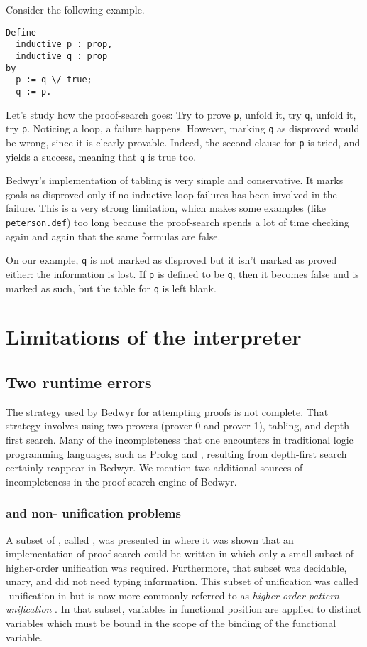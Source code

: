 Consider the following example.
\begin{verbatim}
Define
  inductive p : prop,
  inductive q : prop
by
  p := q \/ true;
  q := p.
\end{verbatim}

Let's study how the proof-search goes:
Try to prove \verb.p., unfold it, try \verb.q., unfold it, try \verb.p..
Noticing a loop, a failure happens.
However, marking \verb.q. as disproved would be wrong,
since it is clearly provable.
Indeed, the second clause for \verb.p. is tried, and yields a
success, meaning that \verb.q. is true too.

Bedwyr's implementation of tabling is very simple and conservative.
It marks goals as
disproved only if no inductive-loop failures has been involved in the failure.
This is a very strong limitation, which makes some examples (like
\verb+peterson.def+) too long because the proof-search spends a lot of time
checking again and again that the same formulas are false.

On our example, \verb.q. is not marked as disproved
but it isn't marked as proved either: the information is lost.
If \verb.p. is defined to be \verb.q.,
then it becomes false and is marked as such,
but the table for \verb.q. is left blank.


\section{Limitations of the interpreter}
\subsection{Two runtime errors}

The strategy used by Bedwyr for attempting proofs is not complete.
That strategy involves using two provers (prover 0 and prover 1),
tabling, and depth-first search.
Many of the incompleteness that one encounters in
traditional logic programming languages, such as Prolog and \lp{},
resulting from depth-first search certainly reappear in Bedwyr.  We
mention two additional sources of incompleteness in the proof search
engine of Bedwyr.

\subsubsection{\texorpdfstring{\Ll{}}{Llambda} and non-\texorpdfstring{\Ll{}}{Llambda} unification problems}
A subset of \lp, called \Ll, was presented in \cite{miller91jlc} where
it was shown that an implementation of proof search could be written
in which only a small subset of higher-order unification was required.
Furthermore, that subset was decidable, unary, and did not need typing
information.  This subset of unification was called \Ll-unification in
\cite{miller91jlc} but is now more commonly referred to as {\em
  higher-order pattern unification}
\cite{nipkow93lics,nadathur05iclp}.  In that subset, variables in
functional position are applied to distinct variables which must be
bound in the scope of the binding of the functional variable.

